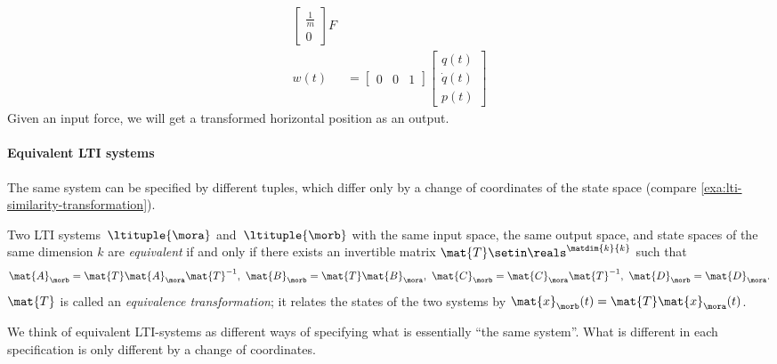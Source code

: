 \begin{example}
\begin{equation*}
\begin{aligned}
\begin{bmatrix}
                \frac{1}{m} \\
                0
            \end{bmatrix} F \\
            w(t)            & =\begin{bmatrix}
                                   0 & 0 & 1
                               \end{bmatrix}\begin{bmatrix}
                                                {q}(t)     \\
                                                \dot{q}(t) \\
                                                {p}(t)
                                            \end{bmatrix}
        \end{aligned}
    \end{equation*}
    Given an input force, we will get a transformed horizontal position as an output.
\end{example}

\paragraph{Equivalent LTI systems}
The same system can be specified by different tuples, which differ only by a change of coordinates of the state space (compare \cref{exa:lti-similarity-transformation}).

\begin{definition}
    \label{def:equivalence_lti}
    Two LTI systems~$\ltituple{\mora}$ and~$\ltituple{\morb}$ with the same input space, the same output space, and state spaces of the same dimension $k$ are \emph{equivalent} if and only if there exists an invertible matrix $\mat{T} \setin \reals^{\matdim{k}{k}}$ such that
    \begin{equation}
        \mat{A}_\morb = \mat{T}\mat{A}_\mora \mat{T}^{-1}, \ \mat{B}_\morb = \mat{T}\mat{B}_\mora, \ \mat{C}_\morb =\mat{C}_\mora\mat{T}^{-1},\ \mat{D}_\morb=\mat{D}_\mora.
    \end{equation}
    $\mat{T}$ is called an \emph{equivalence transformation}; it relates the states of the two systems by $\mat{x}_\morb(t)=\mat{T}\mat{x}_\mora(t)$.
\end{definition}

We think of equivalent LTI-systems as different ways of specifying what is essentially ``the same system''.
What is different in each specification is only different by a change of coordinates.

